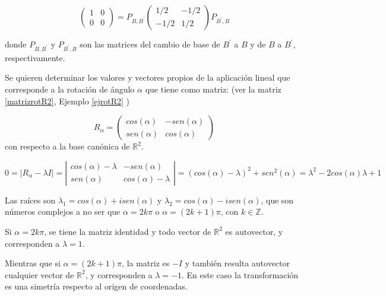 \begin{example}
\bigskip

$$\left(\begin{array}{cc}  1 & 0  \\ 0 &  0
\end{array}
 \right)=  P _{B, B^{\prime}} \left(\begin{array}{cc}  1/2 & -1/2  \\ -1/2 &  1/2
\end{array}
 \right)P _{B^{\prime}, B}$$
 
\bigskip
 
\noindent
 donde $P _{B,B^{\prime}}$ y $P _{B^{\prime}, B}$ son las matrices del cambio de base de $B^{\prime}$ a $B$ y de $B$ a 
 $B^{\prime}$, respectivamente.
  \end{example}
  
 \bigskip
 
\begin{example}
\label{rotautov}


Se quieren determinar los valores y vectores propios de la aplicación lineal que corresponde a la rotación de ángulo $\alpha$ que tiene como matriz: (ver la matriz \ref{matrizrotR2}, Ejemplo  \ref{ejrotR2} )

\bigskip



$$R_\alpha=\left(\begin{array}{cc}  cos(\alpha) &-sen(\alpha)  \\ sen(\alpha) & cos(\alpha)
\end{array}
 \right)$$
\noindent
con respecto a la base canónica de $\mathbb{R}^2$.



\[
0= 
\left   | R_\alpha -   \lambda I \right  | = \left|\begin{array}{cc}
 cos(\alpha)-\lambda  & -sen(\alpha) \\
sen(\alpha) &  cos(\alpha)- \lambda 
\end{array}
\right|=(cos(\alpha)- \lambda)^2+ sen^2(\alpha)= \lambda^2 - 2 cos(\alpha )\lambda +1
\]

\bigskip

Las raíces son $\lambda_1= cos(\alpha) + i sen(\alpha)$ y $\lambda_2= cos(\alpha) - i sen(\alpha)$, que son números complejos a no ser que $ \alpha = 2k \pi $ o $ \alpha = (2k+1) \pi $, con $k \in \mathbb{Z}$.

\bigskip

Si $ \alpha = 2k \pi $, se tiene la matriz identidad  y todo vector de $\mathbb{R}^2$ es autovector, y corresponden a $ \lambda=1$. 

\bigskip

Mientras que si $ \alpha = (2k+1) \pi $, la matriz es $-I$ y también resulta autovector cualquier vector de $\mathbb{R}^2$, y corresponden a $ \lambda=-1$. En este caso la transformación es una simetría respecto al origen de coordenadas.
\end{example}

